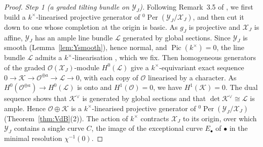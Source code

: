\documentclass[11pt]{amsart}
\numberwithin{table}{section}
\numberwithin{figure}{section}
\numberwithin{equation}{section}
\theoremstyle{definition}
\theoremstyle{plain}
\newcommand{\cO}{\mathcal{O}}
\newcommand{\cX}{\mathcal{X}}
\newcommand{\cY}{\mathcal{Y}}
\newcommand{\bul}{\bullet}
\DeclareMathOperator{\Per}{Per}
\begin{document}
\begin{proof}
\emph{Step 1 (a graded tilting bundle on $\cY_J$).} Following Remark~3.5 of \cite{K}, we first build a $k^\times$-linearised projective generator of ${}^0\Per(\cY_J/\cX_J)$, and then cut it down to one whose completion at the origin is basic. As $g_J$ is projective and $\cX_J$ is affine, $\cY_J$ has an ample line bundle $\mathcal L$ generated by global sections. Since $\cY_J$ is smooth (Lemma~\ref{lem:Ysmooth}), hence normal, and $\operatorname{Pic}(k^\times) = 0$, the line bundle $\mathcal L$ admits a $k^\times$-linearisation \cite[Thm~2.14]{Bri}, which we fix. Then homogeneous generators of the graded $\cO(\cX_J)$-module $H^0(\mathcal L)$ give a $k^\times$-equivariant exact sequence $0 \to \mathcal K \to \cO^{\oplus a} \to \mathcal L \to 0$, with each copy of $\cO$ linearised by a character. As $H^0(\cO^{\oplus a}) \to H^0(\mathcal L)$ is onto and $H^1(\cO) = 0$, we have $H^1(\mathcal K) = 0$. The dual sequence shows that $\mathcal K^\vee$ is generated by global sections and that $\det \mathcal K^\vee \cong \mathcal L$ is ample. Hence $\cO \oplus \mathcal K$ is a $k^\times$-linearised projective generator of ${}^0\Per(\cY_J/\cX_J)$ (Theorem~\ref{thm:VdB}(2)). The action of $k^\times$ contracts $\cX_J$ to its origin, over which $\cY_J$ contains a single curve $C$, the image of the exceptional curve $E_\bul$ of $\bul$ in the minimal resolution $\chi^{-1}(0)$.


\end{proof}
\end{document}
